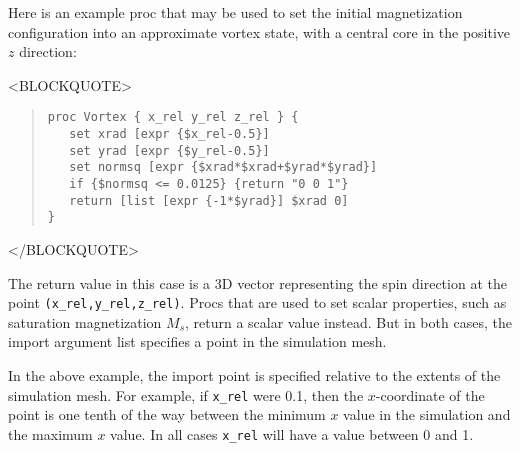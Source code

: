 Here is an example proc that may be used to set the initial
magnetization configuration into an approximate vortex state, with a
central core in the positive $z$ direction:
\begin{rawhtml}
<BLOCKQUOTE>
\end{rawhtml}
\begin{quote}
\begin{verbatim}
proc Vortex { x_rel y_rel z_rel } {
   set xrad [expr {$x_rel-0.5}]
   set yrad [expr {$y_rel-0.5}]
   set normsq [expr {$xrad*$xrad+$yrad*$yrad}]
   if {$normsq <= 0.0125} {return "0 0 1"}
   return [list [expr {-1*$yrad}] $xrad 0]
}
\end{verbatim}
\end{quote}
\begin{rawhtml}
</BLOCKQUOTE>
\end{rawhtml}
The return value in this case is a 3D vector representing the spin
direction at the point \texttt{(x\_rel,y\_rel,z\_rel)}.  Procs
that are used to set scalar properties, such as saturation
magnetization $M_s$, return a scalar value instead.  But in both
cases, the import argument list specifies a point in the simulation
mesh.

In the above example, the import point is specified relative to the
extents of the simulation mesh.  For example, if \texttt{x\_rel} were
0.1, then the $x$-coordinate of the point is one tenth of the way
between the minimum $x$ value in the simulation  and the maximum $x$
value.  In all cases \texttt{x\_rel} will have a value between 0 and
1.

